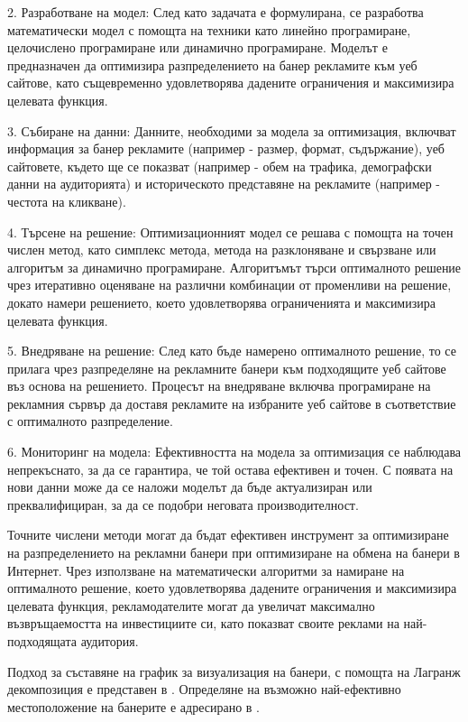 2. Разработване на модел: След като задачата е формулирана, се разработва математически модел с помощта на техники като линейно програмиране, целочислено програмиране или динамично програмиране. Моделът е предназначен да оптимизира разпределението на банер рекламите към уеб сайтове, като същевременно удовлетворява дадените ограничения и максимизира целевата функция.

3. Събиране на данни: Данните, необходими за модела за оптимизация, включват информация за банер рекламите (например - размер, формат, съдържание), уеб сайтовете, където ще се показват (например - обем на трафика, демографски данни на аудиторията) и историческото представяне на рекламите (например - честота на кликване).

4. Търсене на решение: Оптимизационният модел се решава с помощта на точен числен метод, като симплекс метода, метода на разклоняване и свързване или алгоритъм за динамично програмиране. Алгоритъмът търси оптималното решение чрез итеративно оценяване на различни комбинации от променливи на решение, докато намери решението, което удовлетворява ограниченията и максимизира целевата функция.

5. Внедряване на решение: След като бъде намерено оптималното решение, то се прилага чрез разпределяне на рекламните банери към подходящите уеб сайтове въз основа на решението. Процесът на внедряване включва програмиране на рекламния сървър да доставя рекламите на избраните уеб сайтове в съответствие с оптималното разпределение.

6. Мониторинг на модела: Ефективността на модела за оптимизация се наблюдава непрекъснато, за да се гарантира, че той остава ефективен и точен. С появата на нови данни може да се наложи моделът да бъде актуализиран или преквалифициран, за да се подобри неговата производителност.

Точните числени методи могат да бъдат ефективен инструмент за оптимизиране на разпределението на рекламни банери при оптимизиране на обмена на банери в Интернет. Чрез използване на математически алгоритми за намиране на оптималното решение, което удовлетворява дадените ограничения и максимизира целевата функция, рекламодателите могат да увеличат максимално възвръщаемостта на инвестициите си, като показват своите реклами на най-подходящата аудитория.

Подход за съставяне на график за визуализация на банери, с помощта на Лагранж декомпозиция е представен в \cite{10.1145/945846.945848}. Определяне на възможно най-ефективно местоположение на банерите е адресирано в \cite{Kaul2018}.

